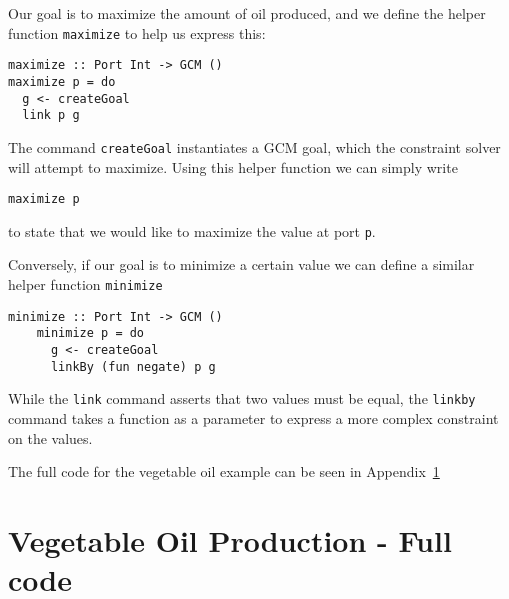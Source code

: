 \documentclass[a4paper]{article}
\begin{document}
Our goal is to maximize the amount of oil produced, and we define the helper
function \texttt{maximize} to help us express this:
\begin{verbatim}
maximize :: Port Int -> GCM ()
maximize p = do
  g <- createGoal
  link p g
\end{verbatim}

The command \texttt{createGoal} instantiates a GCM goal, which the constraint
solver will attempt to maximize. Using this helper function we can simply write
\begin{verbatim}
maximize p
\end{verbatim}
to state that we would like to maximize the value at port \texttt{p}.

Conversely, if our goal is to minimize a certain value we can define a similar
helper function \texttt{minimize}
\begin{verbatim}
minimize :: Port Int -> GCM ()
	minimize p = do
	  g <- createGoal
	  linkBy (fun negate) p g
\end{verbatim}

While the \texttt{link} command asserts that two values must be equal, the
\texttt{linkby} command takes a function as a parameter to express a more
complex constraint on the values.

The full code for the vegetable oil example can be seen in Appendix~\ref{oilcode}
\appendix
\section{Vegetable Oil Production - Full code}\label{oilcode}
\inputminted[linenos]{haskell}{examples/OilCrops.hs}
\end{document}
